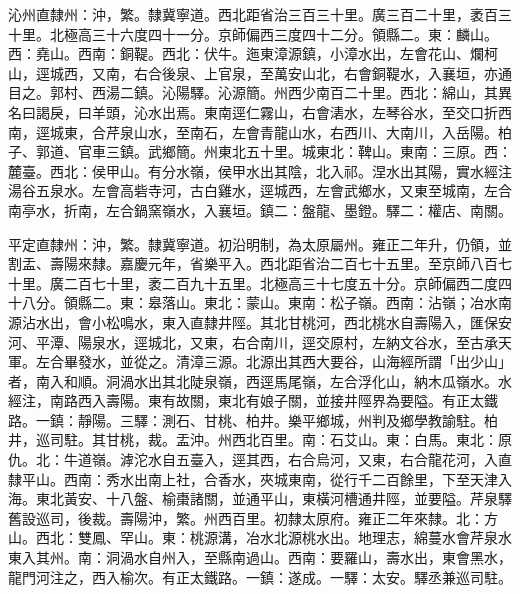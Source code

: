 \begin{pinyinscope}
沁州直隸州：沖，繁。隸冀寧道。西北距省治三百三十里。廣三百二十里，袤百三十里。北極高三十六度四十一分。京師偏西三度四十二分。領縣二。東：麟山。西：堯山。西南：銅鞮。西北：伏牛。迤東漳源鎮，小漳水出，左會花山、爛柯山，逕城西，又南，右合後泉、上官泉，至萬安山北，右會銅鞮水，入襄垣，亦通目之。郭村、西湯二鎮。沁陽驛。沁源簡。州西少南百二十里。西北：綿山，其異名曰謁戾，曰羊頭，沁水出焉。東南逕仁霧山，右會湱水，左琴谷水，至交口折西南，逕城東，合芹泉山水，至南石，左會青龍山水，右西川、大南川，入岳陽。柏子、郭道、官車三鎮。武鄉簡。州東北五十里。城東北：鞞山。東南：三原。西：麓臺。西北：侯甲山。有分水嶺，侯甲水出其陰，北入祁。涅水出其陽，實水經注湯谷五泉水。左會高砦寺河，古白雞水，逕城西，左會武鄉水，又東至城南，左合南亭水，折南，左合鍋窯嶺水，入襄垣。鎮二：盤龍、墨鐙。驛二：權店、南關。

平定直隸州：沖，繁。隸冀寧道。初沿明制，為太原屬州。雍正二年升，仍領，並割盂、壽陽來隸。嘉慶元年，省樂平入。西北距省治二百七十五里。至京師八百七十里。廣二百七十里，袤二百九十五里。北極高三十七度五十分。京師偏西二度四十八分。領縣二。東：皋落山。東北：蒙山。東南：松子嶺。西南：沾嶺；冶水南源沾水出，會小松鳴水，東入直隸井陘。其北甘桃河，西北桃水自壽陽入，匯保安河、平潭、陽泉水，逕城北，又東，右合南川，逕交原村，左納文谷水，至古承天軍。左合畢發水，並從之。清漳三源。北源出其西大要谷，山海經所謂「出少山」者，南入和順。洞渦水出其北陡泉嶺，西逕馬尾嶺，左合浮化山，納木瓜嶺水。水經注，南路西入壽陽。東有故關，東北有娘子關，並接井陘界為要隘。有正太鐵路。一鎮：靜陽。三驛：測石、甘桃、柏井。樂平鄉城，州判及鄉學教諭駐。柏井，巡司駐。其甘桃，裁。盂沖。州西北百里。南：石艾山。東：白馬。東北：原仇。北：牛道嶺。滹沱水自五臺入，逕其西，右合烏河，又東，右合龍花河，入直隸平山。西南：秀水出南上社，合香水，夾城東南，從行千二百餘里，下至天津入海。東北黃安、十八盤、榆棗諸關，並通平山，東橫河槽通井陘，並要隘。芹泉驛舊設巡司，後裁。壽陽沖，繁。州西百里。初隸太原府。雍正二年來隸。北：方山。西北：雙鳳、罕山。東：桃源溝，冶水北源桃水出。地理志，綿蔓水會芹泉水東入其州。南：洞渦水自州入，至縣南過山。西南：要羅山，壽水出，東會黑水，龍門河注之，西入榆次。有正太鐵路。一鎮：遂成。一驛：太安。驛丞兼巡司駐。


\end{pinyinscope}
